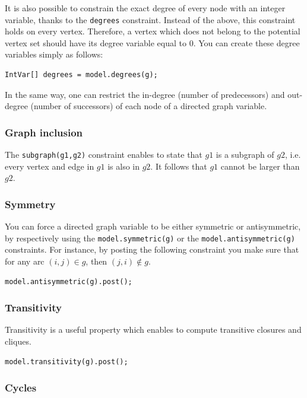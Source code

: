 \documentclass{article}
\begin{document}
It is also possible to constrain the exact degree of every node with an integer variable, thanks to the \texttt{degrees} constraint. Instead of the above, this constraint holds on every vertex. Therefore, a vertex which does not belong to the potential vertex set should have its degree variable equal to $0$. You can create these degree variables simply as follows:
\begin{lstlisting}
IntVar[] degrees = model.degrees(g);
\end{lstlisting}

In the same way, one can restrict the in-degree (number of predecessors) and out-degree (number of successors) of each node of a directed graph variable.  
 
\subsubsection{Graph inclusion}

The \texttt{subgraph(g1,g2)} constraint enables to state that $g1$ is a subgraph of $g2$, i.e. every vertex and edge in $g1$ is also in $g2$. It follows that $g1$ cannot be larger than $g2$. 

\subsubsection{Symmetry}

You can force a directed graph variable to be either symmetric or antisymmetric, by respectively using the \texttt{model.symmetric(g)} or the \texttt{model.antisymmetric(g)} constraints. For instance, by posting the following constraint you make sure that for any arc $(i,j)\in g$, then $(j,i) \notin g$.
\begin{lstlisting}
model.antisymmetric(g).post();
\end{lstlisting}  

\subsubsection{Transitivity}

Transitivity is a useful property which enables to compute transitive closures and cliques. 
\begin{lstlisting}
model.transitivity(g).post();
\end{lstlisting}  

\subsubsection{Cycles}
\end{document}
